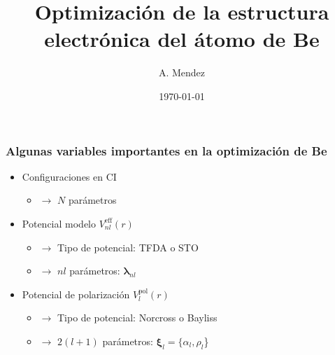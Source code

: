 \documentclass{beamer}
\title{Optimización de la estructura electrónica del átomo de Be}
\author{A. Mendez}
\date{\today} %
\begin{document}
\frame{\titlepage}
\begin{frame}[t]
\frametitle{Algunas variables importantes en la optimización de Be}
\begin{itemize}
\item Configuraciones en CI 
  \begin{itemize}
    \item[ ] $\rightarrow$ $N$ parámetros
  \end{itemize}
\item Potencial modelo $V_{nl}^{\textrm{eff}}(r)$ 
  \begin{itemize}
    \item[ ] $\rightarrow$ Tipo de potencial: TFDA o STO
    \item[ ] $\rightarrow$ $nl$ parámetros: $\boldsymbol{\lambda}_{nl}$ 
  \end{itemize}
\item Potencial de polarización $V_l^{\textrm{pol}}(r)$ 
  \begin{itemize}
    \item[ ] $\rightarrow$ Tipo de potencial: Norcross o Bayliss
    \item[ ] $\rightarrow$ $2(l+1)$ parámetros: $\boldsymbol{\xi}_l=\{\alpha_l,\rho_l$\} 
  \end{itemize}
\end{itemize}
\end{frame}
\end{document}
